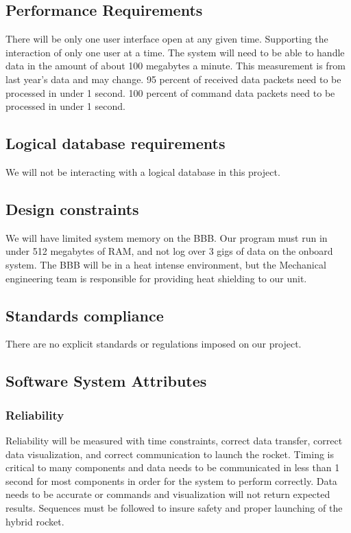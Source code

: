 \documentclass[10pt,draftclsnofoot,onecolumn,compsoc]{IEEEtran}
\begin{document}
\subsection{ Performance Requirements}
There will be only one user interface open at any given time. Supporting the interaction of only one user at a time. The system will need to be able to handle data in the amount of about 100 megabytes a minute. This measurement is from last year's data and may change. 95 percent of received data packets need to be processed in under 1 second. 100 percent of command data packets need to be processed in under 1 second.

\subsection{Logical database requirements}
We will not be interacting with a logical database in this project.

\subsection{Design constraints}
We will have limited system memory on the BBB. Our program must run in under 512 megabytes of RAM, and not log over 3 gigs of data on the onboard system. The BBB will be in a heat intense environment, but the Mechanical engineering team is responsible for providing heat shielding to our unit.

\subsection{Standards compliance}
There are no explicit standards or regulations imposed on our project.

\subsection{Software System Attributes}
\subsubsection{Reliability} Reliability will be measured with time constraints, correct data transfer, correct data visualization, and correct communication to launch the rocket. Timing is critical to many components and data needs to be communicated in less than 1 second for most components in order for the system to perform correctly. Data needs to be accurate or commands and visualization will not return expected results. Sequences must be followed to insure safety and proper launching of the hybrid rocket.
\end{document}
